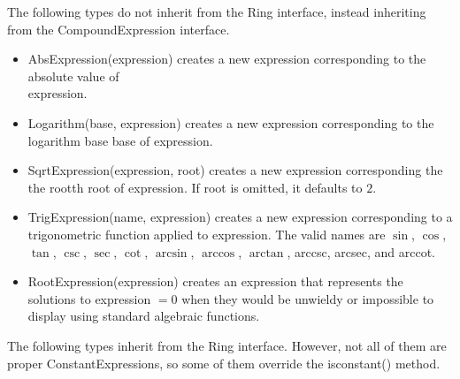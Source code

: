 \documentclass{article}
\begin{document}
The following types do not inherit from the {\ttfamily Ring} interface, instead inheriting from the {\ttfamily CompoundExpression} interface.

\begin{itemize}
    \item {\ttfamily AbsExpression(expression)} creates a new expression corresponding to the absolute value of \\ {\ttfamily expression}.
    \item {\ttfamily Logarithm(base, expression)} creates a new expression corresponding to the logarithm base {\ttfamily base} of {\ttfamily expression}.
    \item {\ttfamily SqrtExpression(expression, root)} creates a new expression corresponding the the {\ttfamily root}th root of {\ttfamily expression}. If {\ttfamily root} is omitted, it defaults to $2$.
    \item {\ttfamily TrigExpression(name, expression)} creates a new expression corresponding to a trigonometric function applied to {\ttfamily expression}. The valid names are $\sin$, $\cos$, $\tan$, $\csc$, $\sec$, $\cot$, $\arcsin$, $\arccos$, $\arctan$, arccsc, arcsec, and arccot.
    
    \item {\ttfamily RootExpression(expression)} creates an expression that represents the solutions to {\ttfamily expression} $= 0$ when they would be unwieldy or impossible to display using standard algebraic functions.
\end{itemize}


The following types inherit from the {\ttfamily Ring} interface. However, not all of them are proper {\ttfamily ConstantExpression}s, so some of them override the {\ttfamily isconstant()} method.
\end{document}
